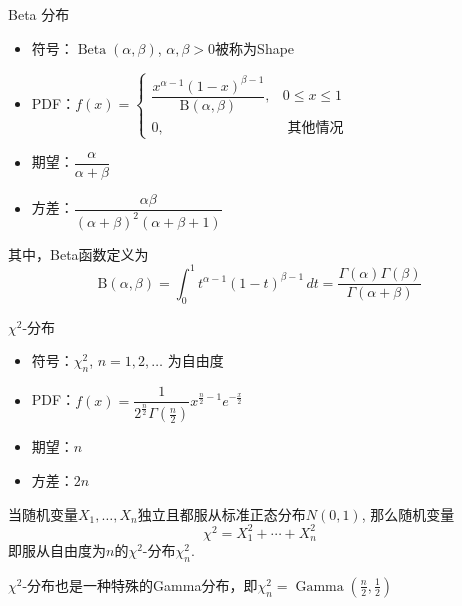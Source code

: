 
\begin{frame}

\begin{block}{Beta 分布}
\begin{itemize}
\item 符号：$\operatorname{Beta}(\alpha,\beta)$, $\alpha,\beta > 0$被称为Shape
\item PDF：$f(x) = \begin{cases}
\dfrac{x^{\alpha-1} (1-x)^{\beta-1}}{\mathrm{B}(\alpha,\beta)}, & 0 \le x \le 1 \\
0, & \text{ 其他情况}
\end{cases}$
\item 期望：$\dfrac{\alpha}{\alpha+\beta}$
\item 方差：$\dfrac{\alpha\beta}{(\alpha+\beta)^2(\alpha+\beta+1)}$
\end{itemize}
\end{block}

其中，Beta函数定义为
$$\mathrm{B} (\alpha,\beta) = \int _{0}^{1}t^{\alpha-1}(1-t)^{\beta-1}\,dt = \dfrac{\Gamma(\alpha)\Gamma(\beta)}{\Gamma(\alpha+\beta)}$$

\end{frame}


\begin{frame}

\begin{block}{$\chi^2$-分布}
\begin{itemize}
\item 符号：$\chi^2_n$, \; $n = 1,2,\ldots$ 为自由度
\item PDF：$f(x) = \dfrac{1}{2^{\frac{n}{2}} \Gamma(\frac{n}{2})} x^{\frac{n}{2}-1} e^{-\frac{x}{2}}$
\item 期望：$n$
\item 方差：$2n$
\end{itemize}

\vspace{1em}
\pause

当随机变量$X_1,\ldots,X_n$独立且都服从标准正态分布$N(0,1)$, 那么随机变量
$$\chi^2 = X_1^2 + \cdots + X_n^2$$
即服从自由度为$n$的$\chi^2$-分布$\chi^2_n$.

\vspace{1em}

$\chi^2$-分布也是一种特殊的Gamma分布，即$\chi^2_n = \operatorname{Gamma}(\frac{n}{2},\frac{1}{2})$
\end{block}

\end{frame}

